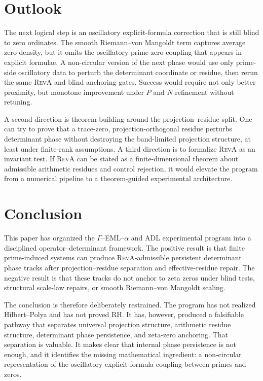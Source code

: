 \documentclass[11pt]{article}
\newcommand{\RevA}{\textsc{RevA}}
\theoremstyle{definition}
\theoremstyle{plain}
\begin{document}
\section{Outlook}

The next logical step is an oscillatory explicit-formula correction that is still blind to zero ordinates.  The smooth Riemann--von Mangoldt term captures average zero density, but it omits the oscillatory prime-zero coupling that appears in explicit formulae.  A non-circular version of the next phase would use only prime-side oscillatory data to perturb the determinant coordinate or residue, then rerun the same \RevA{} and blind anchoring gates.  Success would require not only better proximity, but monotone improvement under $P$ and $N$ refinement without retuning.

A second direction is theorem-building around the projection--residue split.  One can try to prove that a trace-zero, projection-orthogonal residue perturbs determinant phase without destroying the band-limited projection structure, at least under finite-rank assumptions.  A third direction is to formalize \RevA{} as an invariant test.  If \RevA{} can be stated as a finite-dimensional theorem about admissible arithmetic residues and control rejection, it would elevate the program from a numerical pipeline to a theorem-guided experimental architecture.

\section{Conclusion}

This paper has organized the $\Gamma$--EML--$\alpha$ and ADL experimental program into a disciplined operator--determinant framework.  The positive result is that finite prime-induced systems can produce \RevA-admissible persistent determinant phase tracks after projection--residue separation and effective-residue repair.  The negative result is that these tracks do not anchor to zeta zeros under blind tests, structural scale-law repairs, or smooth Riemann--von Mangoldt scaling.

The conclusion is therefore deliberately restrained.  The program has not realized Hilbert--Polya and has not proved RH.  It has, however, produced a falsifiable pathway that separates universal projection structure, arithmetic residue structure, determinant phase persistence, and zeta-zero anchoring.  That separation is valuable.  It makes clear that internal phase persistence is not enough, and it identifies the missing mathematical ingredient: a non-circular representation of the oscillatory explicit-formula coupling between primes and zeros.
\end{document}
